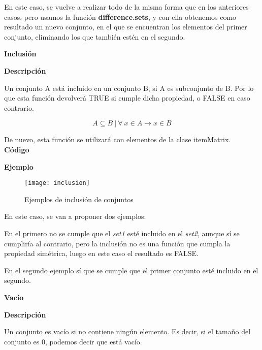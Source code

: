     En este caso, se vuelve a realizar todo de la misma forma que en los anteriores casos, pero usamos la funci\'on \textbf{difference.sets}, y 
    con ella obtenemos como resultado un nuevo conjunto, en el que se encuentran los elementos del primer conjunto, eliminando los que 
    tambi\'en est\'en en el segundo.
    \clearpage


\textbf{ \large Inclusi\'on}

\smallskip

    \textbf{Descripci\'on}

    Un conjunto A est\'a incluido en un conjunto B, si A es subconjunto de B. Por lo que esta funci\'on 
    devolver\'a TRUE si cumple dicha propiedad, o FALSE en caso contrario.

    \[
        A \subseteq B ~ | ~  \forall ~ x \in A \to x \in B 
    \]

    De nuevo, esta funci\'on se utilizar\'a con elementos de la clase itemMatrix.
    \\

    \textbf{C\'odigo}

    
    \bigskip

    \textbf{Ejemplo}

    \begin{figure}[H]
        \centering
        \texttt{[image: inclusion]}
        \caption{Ejemplos de inclusi\'on de conjuntos}
        \label{fig:inclusion}
    \end{figure}

    En este caso, se van a proponer dos ejemplos:

    En el primero no se cumple que el \textit{set1} est\'e incluido en el \textit{set2}, aunque s\'i se cumplir\'ia al contrario, pero la inclusi\'on no es 
    una funci\'on que cumpla la propiedad sim\'etrica, luego en este caso el resultado es FALSE.

    En el segundo ejemplo s\'i que se cumple que el primer conjunto est\'e incluido en el segundo.
    \\

    \bigskip


\textbf{ \large Vac\'io}

\smallskip

    \textbf{Descripci\'on}

    Un conjunto es vac\'io si no contiene ning\'un elemento. Es decir, si el tama\~no del conjunto es 0, 
    podemos decir que est\'a vac\'io. 

